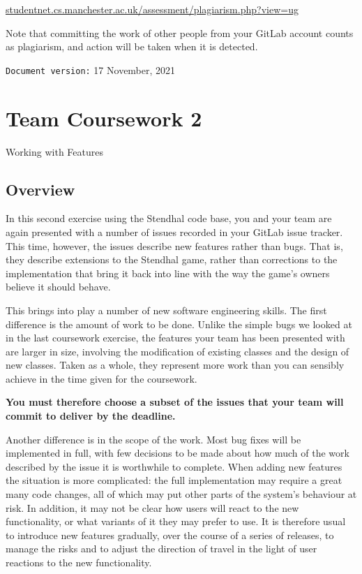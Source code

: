 \documentclass[
]{book}
\begin{document}
\href{http://studentnet.cs.manchester.ac.uk/assessment/plagiarism.php?view=ug}{studentnet.cs.manchester.ac.uk/assessment/plagiarism.php?view=ug}

Note that committing the work of other people from your GitLab account counts as plagiarism, and action will be taken when it is detected.

\texttt{Document\ version:} 17 November, 2021

\hypertarget{working}{%
\chapter{Team Coursework 2}\label{working}}

Working with Features

\hypertarget{ovirew}{%
\section{Overview}\label{ovirew}}

In this second exercise using the Stendhal code base, you and your team are again presented with a number of issues recorded in your GitLab issue tracker. This time, however, the issues describe new features rather than bugs. That is, they describe extensions to the Stendhal game, rather than corrections to the implementation that bring it back into line with the way the game's owners believe it should behave.

This brings into play a number of new software engineering skills. The first difference is the amount of work to be done. Unlike the simple bugs we looked at in the last coursework exercise, the features your team has been presented with are larger in size, involving the modification of existing classes and the design of new classes. Taken as a whole, they represent more work than you can sensibly achieve in the time given for the coursework.

\textbf{You must therefore choose a subset of the issues that your team will commit to deliver by the deadline.}

Another difference is in the scope of the work. Most bug fixes will be implemented in full, with few decisions to be made about how much of the work described by the issue it is worthwhile to complete. When adding new features the situation is more complicated: the full implementation may require a great many code changes, all of which may put other parts of the system's behaviour at risk. In addition, it may not be clear how users will react to the new functionality, or what variants of it they may prefer to use. It is therefore usual to introduce new features gradually, over the course of a series of releases, to manage the risks and to adjust the direction of travel in the light of user reactions to the new functionality.
\end{document}
